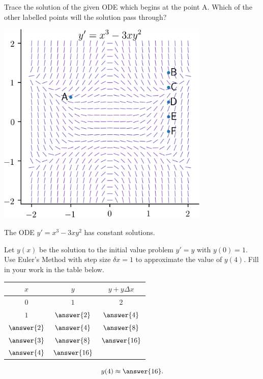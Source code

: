 \documentclass{ximera}
\begin{document}
\begin{exercise}
Trace the solution of the given ODE which begins at the point A. Which of the other labelled points will the solution pass through?
\begin{center}\begin{image}
\includegraphics[width=4in]{images/connect02.png}
\end{image}\end{center}
\begin{multipleChoice}
\end{multipleChoice}
The ODE $y' = x^3 - 3x y^2$ has  constant solutions.
\end{exercise}

\begin{exercise}
Let $y(x)$ be the solution to the initial value problem $y' = y$ with $y(0) = 1$. Use Euler's Method with step size $\delta x = 1$ to approximate the value of $y(4)$. Fill in your work in the table below.
\begin{center}
\begin{tabular}{ccc}
$x$ & $y$  & $y + y \Delta x$ \\
\hline
$0$ & $1$  & $2$ \\
$1$ & $\answer{2}$  & $\answer{4}$ \\
$\answer{2}$ & $\answer{4}$  & $\answer{8}$ \\
$\answer{3}$ & $\answer{8}$ &  $\answer{16}$ \\
$\answer{4}$ & $\answer{16}$   &  \\
\end{tabular}
\end{center}
\[ y(4) \approx \answer{16}. \]
\end{exercise}
\end{document}
